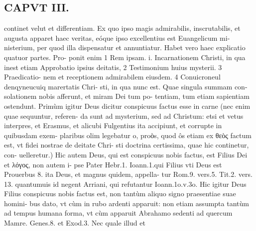 \documentclass{article}
\begin{document}
\begin{pages}
\section*{CAPVT  III. }
\marginpar{[ p.2 ]}\pstart continet velut et differentiam. Ex quo ipso magis admirabilis, inscrutabilis, et augusta apparet haec veritas, eóque  ipso excellentius est Euangelicum mi- nisterium, per quod illa dispensatur et annuntiatur. Habet vero haec explicatio quatuor partes. Pro- ponit enim 1 Rem ipsam. i. Incarnationem Christi, in qua inest etiam Approbatio ipsius deitatis, 2 Testimonium huius mysterii. 3 Praedicatio- nem et receptionem admirabilem eiusdem. 4 Conuicroneul denqyneucuiq marertatis Chri- sti, in qua nunc est. Quae singula summam con- solationem nobis afferunt, et miram Dei tum po- tentiam, tum etiam sapientiam ostendunt.  \pend\pstart Primùm igitur Deus dicitur conspicuus factus esse in carne (nec enim quae sequuntur, referen- da sunt ad mysterium, sed ad Christum: etsi et vetus interpres, et Erasmus, et alicubi Fulgentius ita accipiunt, et corrupte in quibusdam exem- plaribus olim legebatur o, proὸs, quod ôs etiam ex θεὸς factum est, vt fidei nostrae de deitate Chri- sti doctrina certissima, quae hic continetur, con- uelleretur.) Hic autem Deus, qui est conspicuus nobis factus, est Filius Dei et λόγος, non autem i- pse Pater Hebr.1. Ioann.1.qui Filius vti Deus est Prouerbus 8. ita Deus, et magnus quidem, appella- tur Rom.9. vers.5. Tit.2. vers. 13. quantumuis id negent Arriani, qui refutantur Ioann.1o.v.3o. Hic igitur Deus Filius conspicuus nobis factus est, non tantùm aliquo signo praesentiae suae homini- bus dato, vt cùm in rubo ardenti apparuit: non etiam assumpta tantùm ad tempus humana forma, vt cùm apparuit Abrahamo sedenti ad quercum Mamre. Genes.8. et Exod.3. Nec quale illud et  \pend

\end{pages}
\end{document}
